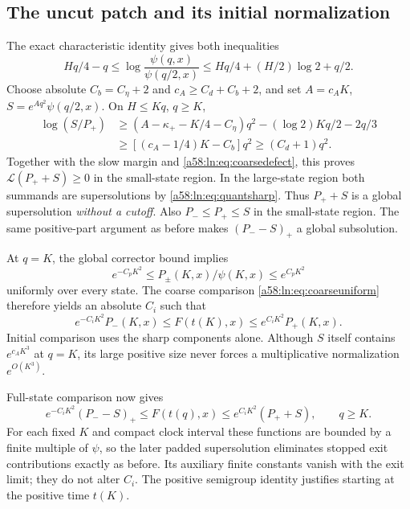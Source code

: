 \documentclass[11pt,letterpaper]{article}
\theoremstyle{remark}
\begin{document}
\subsection{The uncut patch and its initial normalization}
The exact characteristic identity gives both inequalities
\begin{equation}\label{a58:ln:eq:twoslow}
 Hq/4-q\le\log\frac{\psi(q,x)}{\psi(q/2,x)}
 \le Hq/4+(H/2)\log2+q/2.
\end{equation}
Choose absolute $C_b=C_\eta+2$ and
$c_A\ge C_d+C_b+2$, and set
$A=c_AK$, $S=e^{Aq^2}\psi(q/2,x)$. On $H\le Kq$, $q\ge K$,
\begin{align*}
 \log(S/P_+)
 &\ge(A-\kappa_+-K/4-C_\eta)q^2
                   -(\log2)Kq/2-2q/3\\
 &\ge[(c_A-1/4)K-C_b]q^2\ge(C_d+1)q^2.
\end{align*}
Together with the slow margin and \eqref{a58:ln:eq:coarsedefect}, this proves
$\mathcal L(P_++S)\ge0$ in the small-state region. In the large-state
region both summands are supersolutions by \eqref{a58:ln:eq:quantsharp}.
Thus $P_++S$ is a global supersolution \emph{without a cutoff}.
Also $P_-\le P_+\le S$ in the small-state region. The same positive-part
argument as before makes $(P_--S)_+$ a global subsolution.

At $q=K$, the global corrector bound implies
\[
 e^{-C_pK^2}\le P_\pm(K,x)/\psi(K,x)\le e^{C_pK^2}
\]
uniformly over every state. The coarse comparison
\eqref{a58:ln:eq:coarseuniform} therefore yields an absolute $C_i$ such that
\[
 e^{-C_iK^2}P_-(K,x)\le F(t(K),x)
                  \le e^{C_iK^2}P_+(K,x).
\]
Initial comparison uses the sharp components alone. Although $S$ itself
contains $e^{c_AK^3}$ at $q=K$, its large positive size never forces a
multiplicative normalization $e^{O(K^3)}$.

Full-state comparison now gives
\begin{equation}\label{a58:ln:eq:quantglobal}
 e^{-C_iK^2}(P_--S)_+\le F(t(q),x)
                 \le e^{C_iK^2}(P_++S),\qquad q\ge K.
\end{equation}
For each fixed $K$ and compact clock interval these functions are bounded
by a finite multiple of $\psi$, so the later padded supersolution
eliminates stopped exit contributions exactly as before. Its auxiliary
finite constants vanish with the exit limit; they do not alter $C_i$.
The positive semigroup identity justifies starting at the positive time
$t(K)$.
\end{document}
